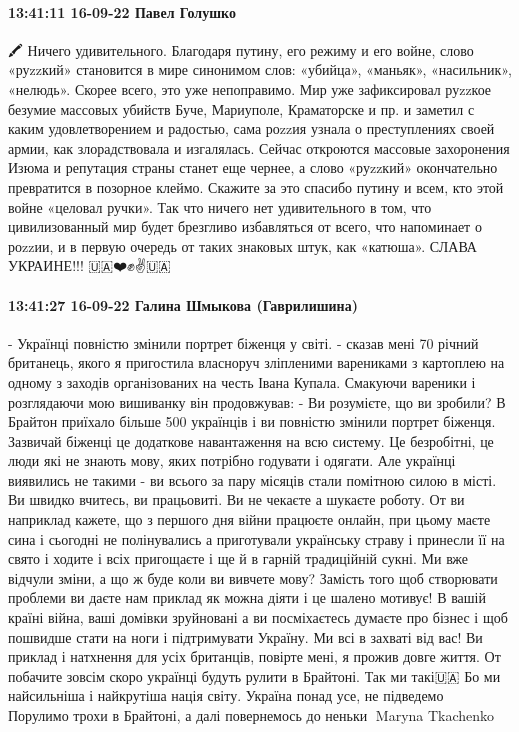 \paragraph{13:41:11 16-09-22 Павел Голушко}
🖍 Ничего удивительного. Благодаря путину, его режиму и его войне, слово «руzzкий» становится в мире синонимом слов: «убийца», «маньяк», «насильник», «нелюдь». Скорее всего, это уже непоправимо.
Мир уже зафиксировал руzzкое безумие массовых убийств Буче, Мариуполе, Краматорске и пр. и заметил с каким удовлетворением и радостью, сама роzzия узнала о преступлениях своей армии, как злорадствовала и изгалялась.
Сейчас откроются массовые захоронения Изюма и репутация страны станет еще чернее, а слово «руzzкий» окончательно превратится в позорное клеймо. Скажите за это спасибо путину и всем, кто этой войне «целовал ручки». Так что ничего нет удивительного в том, что цивилизованный мир будет брезгливо избавляться от всего, что напоминает о роzzии, и в первую очередь от таких знаковых штук, как «катюша».
СЛАВА УКРАИНЕ!!!
🇺🇦❤️✊✌️🇺🇦

\paragraph{13:41:27 16-09-22 Галина Шмыкова (Гаврилишина)}

- Українці повністю змінили портрет біженця у світі.
- сказав мені 70 річний британець, якого я пригостила власноруч зліпленими варениками з картоплею на одному з заходів організованих на честь Івана Купала.
Смакуючи вареники і розглядаючи мою вишиванку він продовжував:
- Ви розумієте, що ви зробили?
В Брайтон приїхало більше 500 українців і ви повністю змінили портрет біженця.
Зазвичай біженці це додаткове навантаження на всю систему. Це безробітні, це люди які не знають мову, яких потрібно годувати і одягати.
Але українці виявились не такими - ви всього за пару місяців стали помітною силою в місті. Ви швидко вчитесь, ви працьовиті. Ви не чекаєте а шукаєте роботу. От ви наприклад кажете, що з першого дня війни працюєте онлайн, при цьому маєте сина і сьогодні не полінувались а приготували українську страву і принесли її на свято і ходите і всіх пригощаєте і ще й в гарній традиційній сукні.
Ми вже відчули зміни, а що ж буде коли ви вивчете мову? Замість того щоб створювати проблеми ви даєте нам приклад як можна діяти і це шалено мотивує! В вашій країні війна, ваші домівки зруйновані а ви посміхаєтесь думаєте про бізнес і щоб пошвидше стати на ноги і підтримувати Україну. Ми всі в захваті від вас!
Ви приклад і натхнення для усіх британців, повірте мені, я прожив довге життя. От побачите зовсім скоро українці будуть рулити в Брайтоні.
Так ми такі🇺🇦
Бо ми найсильніша і найкрутіша нація світу.
Україна понад усе, не підведемо💪🏽
Порулимо трохи в Брайтоні, а далі повернемось до неньки🥰
Maryna Tkachenko

